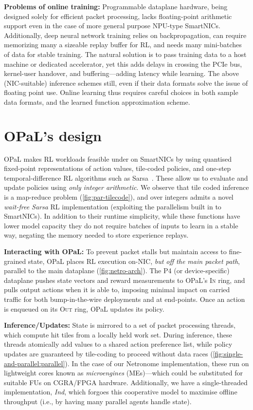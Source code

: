 \documentclass[
sigconf,natbib=false
]{acmart}
\newcommand{\fakepara}[1]{\noindent\textbf{#1:}}
\newcommand{\approachshort}{OPaL}
\newcommand{\Indfw}{\emph{Ind}}
\newcommand{\indfw}{\Indfw}
\newcommand{\inring}{\textsc{In}}
\newcommand{\outring}{\textsc{Out}}
\begin{document}
\fakepara{Problems of online training}
Programmable dataplane hardware, being designed solely for efficient packet processing, lacks floating-point arithmetic support even in the case of more general purpose NPU-type SmartNICs.
Additionally, deep neural network training relies on backpropagation, can require memorizing many a sizeable replay buffer for RL, and needs many mini-batches of data for stable training.
The natural solution is to pass training data to a host machine or dedicated accelerator, yet this adds delays in crossing the PCIe bus, kernel-user handover, and buffering---adding latency while learning.
The above (NIC-suitable) inference schemes still, even if their data formats solve the issue of floating point use.
Online learning thus requires careful choices in both sample data formats, and the learned function approximation scheme.

\section{\approachshort{}'s design}
\approachshort{} makes RL workloads feasible under on SmartNICs by using quantised fixed-point representations of action values, tile-coded policies, and one-step temporal-difference RL algorithms such as Sarsa~\parencite{RL2E}.
These allow us to evaluate and update policies using \emph{only integer arithmetic}.
We observe that tile coded inference is a map-reduce problem (\cref{fig:par-tilecode}), and over integers admits a novel \emph{wait-free Sarsa} RL implementation (exploiting the parallelism built in to SmartNICs).
In addition to their runtime simplicity, while these functions have lower model capacity they do not require batches of inputs to learn in a stable way, negating the memory needed to store experience replays.

\fakepara{Interacting with \approachshort{}}
To prevent packet stalls but maintain access to fine-grained state, \approachshort{} places RL execution on-NIC, \emph{but off the main packet path}, parallel to the main dataplane (\cref{fig:netro-arch}).
The P4 (or device-specific) dataplane pushes state vectors and reward measurements to \approachshort{}'s \inring{} ring, and pulls output actions when it is able to, imposing minimal impact on carried traffic for both bump-in-the-wire deployments and at end-points.
Once an action is enqueued on its \outring{} ring, \approachshort{} updates its policy.

\fakepara{Inference/Updates}
State is mirrored to a set of packet processing threads, which compute hit tiles from a locally held work set.
During inference, these threads atomically add values to a shared action preference list, while policy updates are guaranteed by tile-coding to proceed without data races (\cref{fig:single-and-parallel:parallel}).
In the case of our Netronome implementation, these run on lightweight cores known as \emph{microengines} (MEs)---which could be substituted for suitable FUs on CGRA/FPGA hardware.
Additionally, we have a single-threaded implementation, \indfw, which forgoes this cooperative model to maximise offline throughput (i.e., by having many parallel agents handle state).
\end{document}
